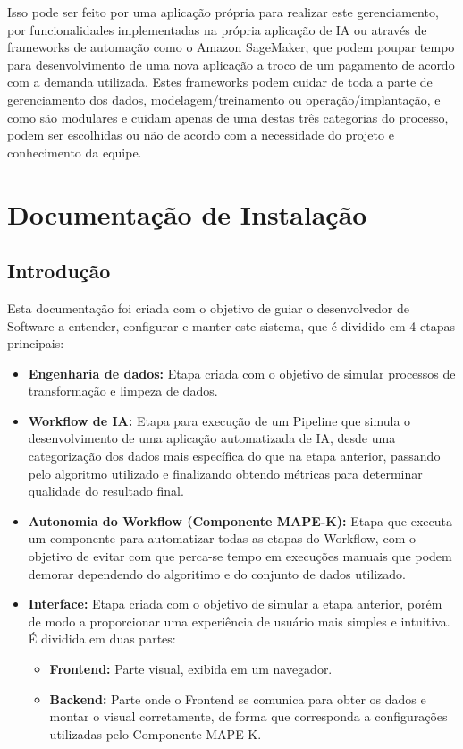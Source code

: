 \documentclass[portugues]{ic-tese}
\begin{document}
Isso pode ser feito por uma aplicação própria para realizar este gerenciamento, por funcionalidades implementadas na própria aplicação de IA ou através de frameworks de automação como o Amazon SageMaker, que podem poupar tempo para desenvolvimento de uma nova aplicação a troco de um pagamento de acordo com a demanda utilizada. Estes frameworks podem cuidar de toda a parte de gerenciamento dos dados, modelagem/treinamento ou operação/implantação, e como são modulares e cuidam apenas de uma destas três categorias do processo, podem ser escolhidas ou não de acordo com a necessidade do projeto e conhecimento da equipe.


\annex
\chapter{Documentação de Instalação}
\label{ann:DocInstall}

\section{Introdução}

Esta documentação foi criada com o objetivo de guiar o desenvolvedor de Software a entender, configurar e manter este sistema, que é dividido em 4 etapas principais:

\begin{itemize}
    \item {\textbf{Engenharia de dados:}} Etapa criada com o objetivo de simular processos de transformação e limpeza de dados.
    \item {\textbf{Workflow de IA:}} Etapa para execução de um Pipeline que simula o desenvolvimento de uma aplicação automatizada de IA, desde uma categorização dos dados mais específica do que na etapa anterior, passando pelo algoritmo utilizado e finalizando obtendo métricas para determinar qualidade do resultado final.
    \item {\textbf{Autonomia do Workflow (Componente MAPE-K):}} Etapa que executa um componente para automatizar todas as etapas do Workflow, com o objetivo de evitar com que perca-se tempo em execuções manuais que podem demorar dependendo do algoritimo e do conjunto de dados utilizado.
    \item {\textbf{Interface:}} Etapa criada com o objetivo de simular a etapa anterior, porém de modo a proporcionar uma experiência de usuário mais simples e intuitiva. É dividida em duas partes:
    \begin{itemize}
        \item {\textbf{Frontend:}} Parte visual, exibida em um navegador.
        \item \textbf{{Backend:}} Parte onde o Frontend se comunica para obter os dados e montar o visual corretamente, de forma que corresponda a configurações utilizadas pelo Componente MAPE-K.
    \end{itemize}
\end{itemize}
\end{document}
